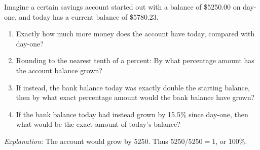 
\begin{stmt}
Imagine a certain savings account started out with a balance of \$5250.00 on day-one, and today has a current balance of \$5780.23.
\begin{enumerate}[label=(\alph*), leftmargin=2em, topsep=2pt, itemsep=1pt]
\item Exactly how much more money does the account have today, compared with day-one?
\item Rounding to the nearest tenth of a percent: By what percentage amount has the account balance grown?
\item If instead, the bank balance today was exactly double the starting balance, then by what exact percentage amount would the bank balance have grown?
\item If the bank balance today had instead grown by 15.5\% since day-one, then what would be the exact amount of today's balance?
\end{enumerate}
\end{stmt}

\begin{sol}
 


 


 


\textit{Explanation:} The account would grow by 5250. Thus $5250/5250 = 1$, or 100\%.

 

\end{sol}


